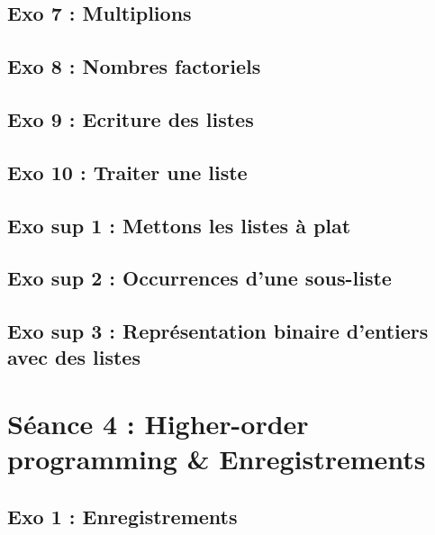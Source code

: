 \subsection{Exo 7 : Multiplions}


\subsection{Exo 8 : Nombres factoriels}


\subsection{Exo 9 : Ecriture des listes}


\subsection{Exo 10 : Traiter une liste}



\subsection{Exo sup 1 : Mettons les listes à plat}


\subsection{Exo sup 2 : Occurrences d'une sous-liste}


\subsection{Exo sup 3 : Représentation binaire d'entiers avec des listes}











\newpage
\section{Séance 4 : Higher-order programming \& Enregistrements}

\subsection{Exo 1 : Enregistrements}


